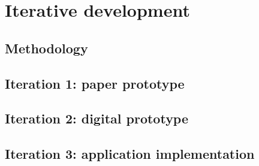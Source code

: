 \chapter{Iterative development}\label{chapter:prototype}

\section{Methodology}\label{chapter:prototype:section:methodology}



\section{Iteration 1: paper prototype}\label{chapter:prototype:section:paper}



\section{Iteration 2: digital prototype}\label{chapter:prototype:section:digital}



\section{Iteration 3: application implementation}\label{chapter:prototype:section:implementation}


